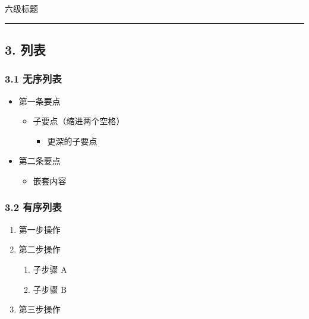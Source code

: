 \documentclass[]{article}
\providecommand{\tightlist}{\itemsep0pt}
\begin{document}
六级标题

\begin{center}\rule{0.5\linewidth}{0.5pt}\end{center}

\subsection{3. 列表}\label{ux5217ux8868}

\subsubsection{3.1 无序列表}\label{ux65e0ux5e8fux5217ux8868}

\begin{itemize}
\tightlist
\item
  第一条要点

  \begin{itemize}
  \tightlist
  \item
    子要点（缩进两个空格）

    \begin{itemize}
    \tightlist
    \item
      更深的子要点
    \end{itemize}
  \end{itemize}
\item
  第二条要点

  \begin{itemize}
  \tightlist
  \item
    嵌套内容
  \end{itemize}
\end{itemize}

\subsubsection{3.2 有序列表}\label{ux6709ux5e8fux5217ux8868}

\begin{enumerate}
\def\labelenumi{\arabic{enumi}.}
\tightlist
\item
  第一步操作
\item
  第二步操作

  \begin{enumerate}
  \def\labelenumii{\arabic{enumii}.}
  \tightlist
  \item
    子步骤 A
  \item
    子步骤 B
  \end{enumerate}
\item
  第三步操作
\end{enumerate}
\end{document}
